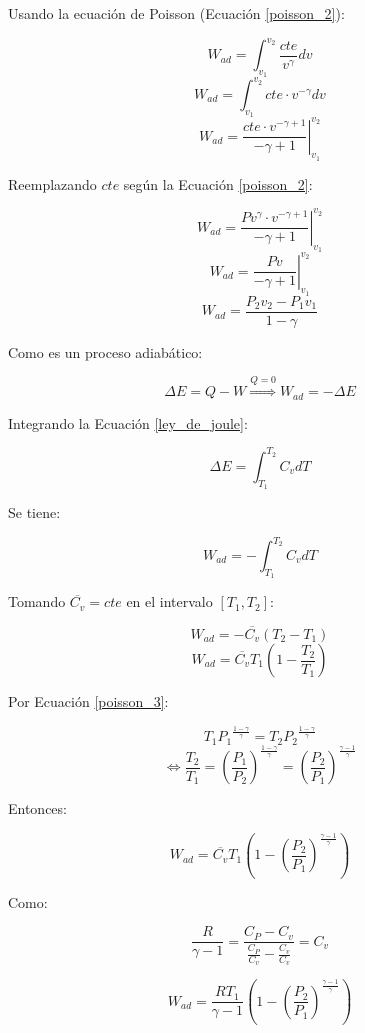     Usando la ecuación de Poisson (Ecuación \ref{poisson_2}):
    
    \[W_{ad}=\int_{v_{1}}^{v_{2}}\frac{cte}{v^{\gamma}}dv\]
    \[W_{ad}=\int_{v_{1}}^{v_{2}}cte\cdot v^{-\gamma}dv\]
    \[W_{ad}=\left . \frac{cte \cdot v^{-\gamma + 1}}{-\gamma + 1} \right |_{v_{1}}^{v_{2}}\]
    
    Reemplazando \(cte\) según la Ecuación \ref{poisson_2}:
    
    \[W_{ad}=\left . \frac{Pv^{\gamma} \cdot v^{-\gamma + 1}}{-\gamma + 1} \right |_{v_{1}}^{v_{2}}\]
    \[W_{ad}=\left . \frac{Pv}{-\gamma + 1} \right |_{v_{1}}^{v_{2}}\]
    \begin{equation}
        W_{ad}=\frac{P_{2}v_{2} - P_{1}v_{1}}{1 - \gamma}
    \end{equation}
    
    Como es un proceso adiabático:
    
    \[\Delta E=Q - W \overset{Q=0}{\Rightarrow} W_{ad}=-\Delta E\]
    
    Integrando la Ecuación \ref{ley_de_joule}:
    
    \[\Delta E=\int_{T_{1}}^{T_{2}}C_{v}dT\]
    
    Se tiene:
    
    \[W_{ad}=-\int_{T_{1}}^{T_{2}}C_{v}dT\]
    
    Tomando \(\overline{C_{v}}=cte\) en el intervalo \([T_{1}, T_{2}]\):
    
    \[W_{ad}=-\overline{C_{v}}\left ( T_{2} - T_{1} \right )\]
    \[W_{ad}=\overline{C_{v}}T_{1}\left ( 1 - \frac{T_{2}}{T_{1}} \right )\]
    
    Por Ecuación \ref{poisson_3}:
    
    \[T_{1}{P_{1}}^{\frac{1-\gamma}{\gamma}}=T_{2}{P_{2}}^{\frac{1-\gamma}{\gamma}}\]
    \[\Leftrightarrow \frac{T_{2}}{T_{1}}=\left ( \frac{P_{1}}{P_{2}}\right )^{\frac{1-\gamma}{\gamma}}=\left ( \frac{P_{2}}{P_{1}}\right )^{\frac{\gamma-1}{\gamma}}\]
    
    Entonces:
    
    \[W_{ad}=\overline{C_{v}}T_{1}\left ( 1 - \left ( \frac{P_{2}}{P_{1}}\right )^{\frac{\gamma-1}{\gamma}} \right )\]
    
    Como:
    
    \[\frac{R}{\gamma - 1}=\frac{C_{P}-C_{v}}{\frac{C_{P}}{C_{v}} - \frac{C_{v}}{C_{v}}}=C_{v}\]
    
    \begin{equation}
    \label{trabajo_ad}
        W_{ad}=\frac{RT_{1}}{\gamma - 1}\left ( 1 - \left ( \frac{P_{2}}{P_{1}}\right )^{\frac{\gamma-1}{\gamma}} \right )
    \end{equation}
    
